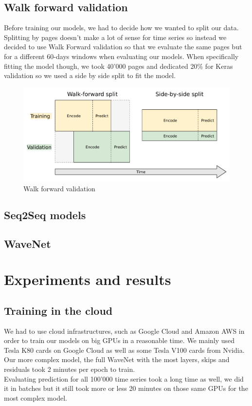 \documentclass[11pt]{article}
\begin{document}
    \subsection{Walk forward validation}
    Before training our models, we had to decide how we wanted to split our data. Splitting by pages doesn't make a lot of sense for time series so instead we decided to use Walk Forward validation so that we evaluate the same pages but for a different 60-days windows when evaluating our models. When specifically fitting the model though, we took 40'000 pages and dedicated 20\% for Keras validation so we used a side by side split to fit the model.
    \begin{figure}[H]
        \centering
        \includegraphics[width=.7\textwidth]{walkforward.png}
        \caption{Walk forward validation}
    \end{figure}

    \subsection{Seq2Seq models}
    \subsection{WaveNet}
    \newpage
    \section{Experiments and results}
    \subsection{Training in the cloud}
    We had to use cloud infrastructures, such as Google Cloud and Amazon AWS in order to train our models on big GPUs in a reasonable time. We mainly used Tesla K80 cards on Google Cloud as well as some Tesla V100 cards from Nvidia. Our more complex model, the full WaveNet with the most layers, skips and residuals took 2 minutes per epoch to train.\\

    Evaluating prediction for all 100'000 time series took a long time as well, we did it in batches but it still took more or less 20 minutes on those same GPUs for the most complex model.
\end{document}
